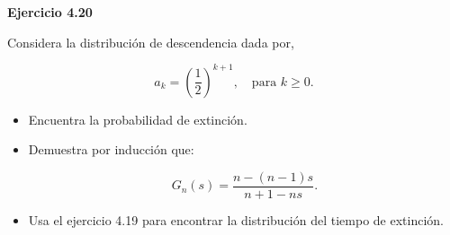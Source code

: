 \documentclass{article}
\begin{document}
\textbf{Ejercicio 4.20}

Considera la distribución de descendencia dada por,

\[
a_k = \left(\frac{1}{2}\right)^{k+1}, \quad \text{para } k \geq 0.
\]

\begin{itemize}
    \item[(a)] Encuentra la probabilidad de extinción.
    \item[(b)] Demuestra por inducción que:

    \[
    G_n(s) = \frac{n - (n-1)s}{n + 1 - ns}.
    \]

    \item[(c)] Usa el ejercicio 4.19 para encontrar la distribución del tiempo de extinción.
\end{itemize}
\end{document}
